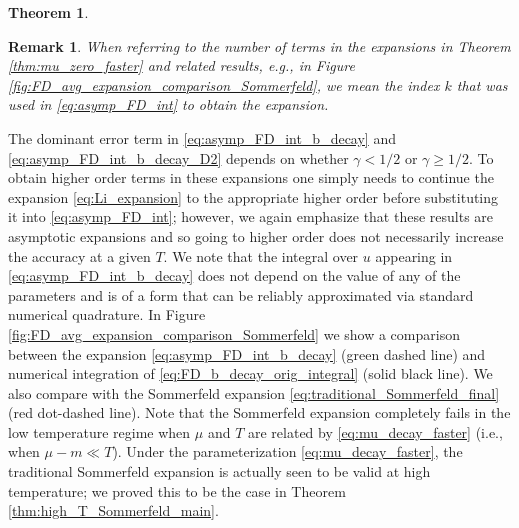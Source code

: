 \documentclass[sn-mathphys,Numbered]{sn-jnl}
\newtheorem{theorem}{Theorem}
\newtheorem{remark}{Remark}
\begin{document}
\begin{theorem}

\end{theorem}
\begin{remark}
 When referring to the number of terms in the expansions in Theorem \ref{thm:mu_zero_faster} and related results, e.g., in Figure \ref{fig:FD_avg_expansion_comparison_Sommerfeld},  we mean the index $k$ that was used in \eqref{eq:asymp_FD_int} to obtain the expansion.
\end{remark}
The dominant error term in \eqref{eq:asymp_FD_int_b_decay} and \eqref{eq:asymp_FD_int_b_decay_D2} depends on whether $\gamma<1/2$ or $\gamma\geq 1/2$. To obtain higher order terms in these expansions one simply needs to  continue the expansion \eqref{eq:Li_expansion} to the appropriate higher order before substituting it into \eqref{eq:asymp_FD_int}; however, we again emphasize that these results are asymptotic expansions and so going to higher order does not necessarily increase the accuracy at a given $T$. We note that the integral over $u$ appearing in \eqref{eq:asymp_FD_int_b_decay}  does not depend on the value of any of the parameters and is of a form that can be  reliably approximated via standard numerical quadrature.  In Figure \ref{fig:FD_avg_expansion_comparison_Sommerfeld} we show a comparison between the expansion \eqref{eq:asymp_FD_int_b_decay} (green dashed line) and numerical integration of \eqref{eq:FD_b_decay_orig_integral} (solid black line).  We also compare with the Sommerfeld expansion \eqref{eq:traditional_Sommerfeld_final} (red dot-dashed line).  Note that the Sommerfeld expansion completely fails in the low temperature regime when $\mu$ and $T$ are related by \eqref{eq:mu_decay_faster} (i.e., when $\mu-m\ll T$).  Under the parameterization \eqref{eq:mu_decay_faster}, the traditional Sommerfeld expansion is actually seen to be valid at high temperature; we proved this to be the case in Theorem \ref{thm:high_T_Sommerfeld_main}.
\end{document}
